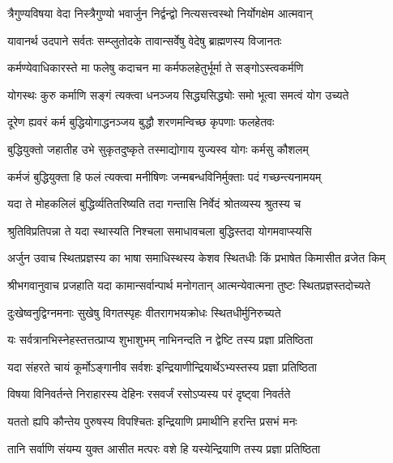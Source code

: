 \twolineshloka
{त्रैगुण्यविषया वेदा निस्त्रैगुण्यो भवार्जुन}
{निर्द्वन्द्वो नित्यसत्त्वस्थो निर्योगक्षेम आत्मवान्}%

\twolineshloka
{यावानर्थ उदपाने सर्वतः सम्प्लुतोदके}
{तावान्सर्वेषु वेदेषु ब्राह्मणस्य विजानतः}%

\twolineshloka
{कर्मण्येवाधिकारस्ते मा फलेषु कदाचन}
{मा कर्मफलहेतुर्भूर्मा ते सङ्गोऽस्त्वकर्मणि}%

\twolineshloka
{योगस्थः कुरु कर्माणि सङ्गं त्यक्त्वा धनञ्जय}
{सिद्ध्यसिद्ध्योः समो भूत्वा समत्वं योग उच्यते}%

\twolineshloka
{दूरेण ह्यवरं कर्म बुद्धियोगाद्धनञ्जय}
{बुद्धौ शरणमन्विच्छ कृपणाः फलहेतवः}%

\twolineshloka
{बुद्धियुक्तो जहातीह उभे सुकृतदुष्कृते}
{तस्माद्योगाय युज्यस्व योगः कर्मसु कौशलम्}%

\twolineshloka
{कर्मजं बुद्धियुक्ता हि फलं त्यक्त्वा मनीषिणः}
{जन्मबन्धविनिर्मुक्ताः पदं गच्छन्त्यनामयम्}%

\twolineshloka
{यदा ते मोहकलिलं बुद्धिर्व्यतितरिष्यति}
{तदा गन्तासि निर्वेदं श्रोतव्यस्य श्रुतस्य च}%

\twolineshloka
{श्रुतिविप्रतिपन्ना ते यदा स्थास्यति निश्चला}
{समाधावचला बुद्धिस्तदा योगमवाप्स्यसि}%

{अर्जुन उवाच}
\twolineshloka
{स्थितप्रज्ञस्य का भाषा समाधिस्थस्य केशव}
{स्थितधीः किं प्रभाषेत किमासीत व्रजेत किम्}%

{श्रीभगवानुवाच}
\twolineshloka
{प्रजहाति यदा कामान्सर्वान्पार्थ मनोगतान्}
{आत्मन्येवात्मना तुष्टः स्थितप्रज्ञस्तदोच्यते}%

\twolineshloka
{दुःखेष्वनुद्विग्नमनाः सुखेषु विगतस्पृहः}
{वीतरागभयक्रोधः स्थितधीर्मुनिरुच्यते}%

\twolineshloka
{यः सर्वत्रानभिस्नेहस्तत्तत्प्राप्य शुभाशुभम्}
{नाभिनन्दति न द्वेष्टि तस्य प्रज्ञा प्रतिष्ठिता}%

\twolineshloka
{यदा संहरते चायं कूर्मोऽङ्गानीव सर्वशः}
{इन्द्रियाणीन्द्रियार्थेऽभ्यस्तस्य प्रज्ञा प्रतिष्ठिता}%

\twolineshloka
{विषया विनिवर्तन्ते निराहारस्य देहिनः}
{रसवर्जं रसोऽप्यस्य परं दृष्ट्वा निवर्तते}%

\twolineshloka
{यततो ह्यपि कौन्तेय पुरुषस्य विपश्चितः}
{इन्द्रियाणि प्रमाथीनि हरन्ति प्रसभं मनः}%

\twolineshloka
{तानि सर्वाणि संयम्य युक्त आसीत मत्परः}
{वशे हि यस्येन्द्रियाणि तस्य प्रज्ञा प्रतिष्ठिता}%

